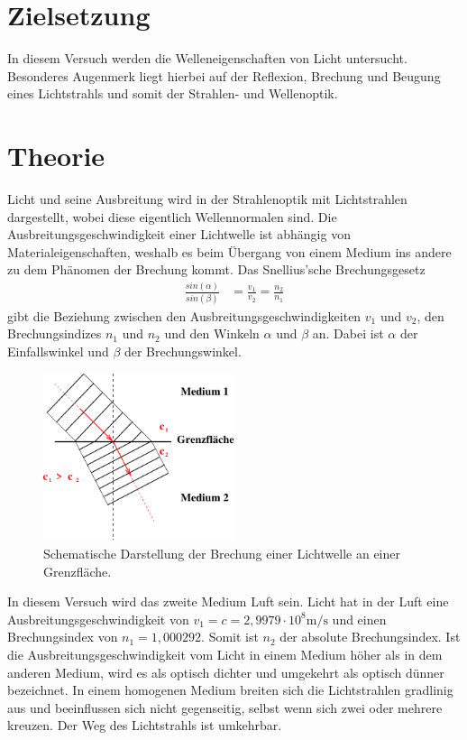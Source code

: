 \section{Zielsetzung}
\label{sec:Zielsetzung}

In diesem Versuch werden die Welleneigenschaften von Licht untersucht. Besonderes Augenmerk liegt hierbei auf der Reflexion, 
Brechung und Beugung eines Lichtstrahls und somit der Strahlen- und Wellenoptik.

\section{Theorie}
\label{sec:Theorie}
Licht und seine Ausbreitung wird in der Strahlenoptik mit Lichtstrahlen dargestellt, wobei diese eigentlich Wellennormalen sind.
Die Ausbreitungsgeschwindigkeit einer Lichtwelle ist abhängig von Materialeigenschaften, weshalb es
beim Übergang von einem Medium ins andere zu dem Phänomen der Brechung kommt.
Das Snellius'sche Brechungsgesetz
\begin{align}
    \frac{sin(\alpha)}{sin(\beta)}  &= \frac{v_1}{v_2} = \frac{n_2}{n_1}
    \label{eqn:Brechung}
\end{align}
gibt die Beziehung zwischen den Ausbreitungsgeschwindigkeiten $v_1$ und $v_2$, den Brechungsindizes $n_1$ und $n_2$ und den Winkeln $\alpha$ und $\beta$ an.
Dabei ist $\alpha$ der Einfallswinkel und $\beta$ der Brechungswinkel.
\begin{figure}[H]
    \centering
    \includegraphics[width=0.5\textwidth]{build/Abb_1.pdf}
    \caption {Schematische Darstellung der Brechung einer Lichtwelle an einer Grenzfläche\cite[1]{V400}.}
    \label{fig:Abb_1}
\end{figure}
In diesem Versuch wird das zweite Medium Luft sein. 
Licht hat in der Luft eine Ausbreitungsgeschwindigkeit von $v_1 = c = 2,9979 \cdot 10^8 \si{\meter\per\second}$ und einen Brechungsindex von $n_1 = 1,000292$.
Somit ist $n_2$ der absolute Brechungsindex.
Ist die Ausbreitungsgeschwindigkeit vom Licht in einem Medium höher als in dem anderen Medium, 
wird es als optisch dichter und umgekehrt als optisch dünner bezeichnet.
In einem homogenen Medium breiten sich die Lichtstrahlen gradlinig aus und beeinflussen sich nicht gegenseitig, selbst wenn sich zwei oder mehrere kreuzen.
Der Weg des Lichtstrahls ist umkehrbar.

